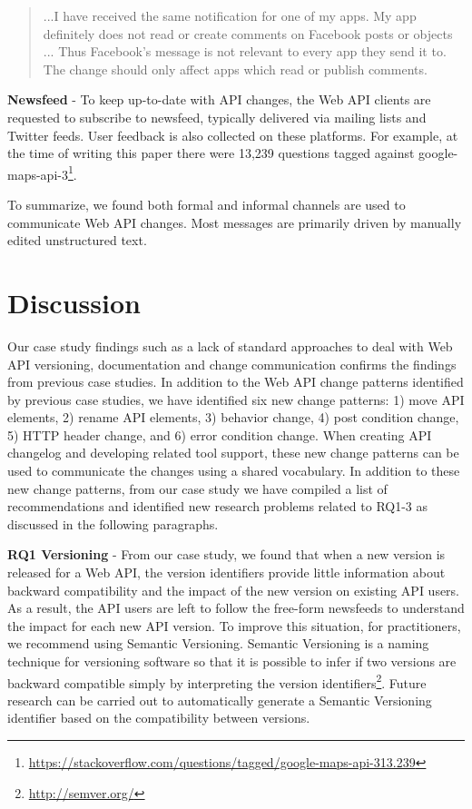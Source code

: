 \small
\begin{quotation}
...I have received the same notification for one of my apps. My app definitely does not read or create comments on Facebook posts or objects ... Thus Facebook's message is not relevant to every app they send it to.
The change should only affect apps which read or publish comments.
\end{quotation}
\normalsize

  \textbf{Newsfeed} - To keep up-to-date with API changes, the Web API clients are requested to subscribe to newsfeed, typically delivered via mailing lists and Twitter feeds. User feedback is also collected on these platforms. For example, at the time of writing this paper there were 13,239 questions tagged against google-maps-api-3\footnote{\url{https://stackoverflow.com/questions/tagged/google-maps-api-313.239}}.


To summarize, we found both formal and informal channels are used to communicate Web API changes. Most messages are primarily driven by manually edited unstructured text.

\section{Discussion} %
\label{sec:discussion}
Our case study findings such as a lack of standard approaches to deal with Web API versioning, documentation and change communication confirms the findings from previous case studies. In addition to the Web API change patterns identified by previous case studies, we have identified six new change patterns: 1) move API elements, 2) rename API elements, 3) behavior change, 4) post condition change, 5) HTTP header change, and 6) error condition change. When creating API changelog and developing related tool support, these new change patterns can be used to communicate the changes using a shared vocabulary. In addition to these new change patterns, from our case study we have compiled a list of recommendations and identified new research problems related to RQ1-3 as discussed in the following paragraphs.

\textbf{RQ1 Versioning} - From our case study, we found that when a new version is released for a Web API, the version identifiers provide little information about backward compatibility and the impact of the new version on existing API users. As a result, the API users are left to follow the free-form newsfeeds to understand the impact for each new API version. To improve this situation, for practitioners, we recommend using Semantic Versioning. Semantic Versioning is a naming technique for versioning software so that it is possible to infer if two versions are backward compatible simply by interpreting the version identifiers\footnote{\url{http://semver.org/}}. Future research can be carried out to automatically generate a Semantic Versioning identifier based on the compatibility between versions.

